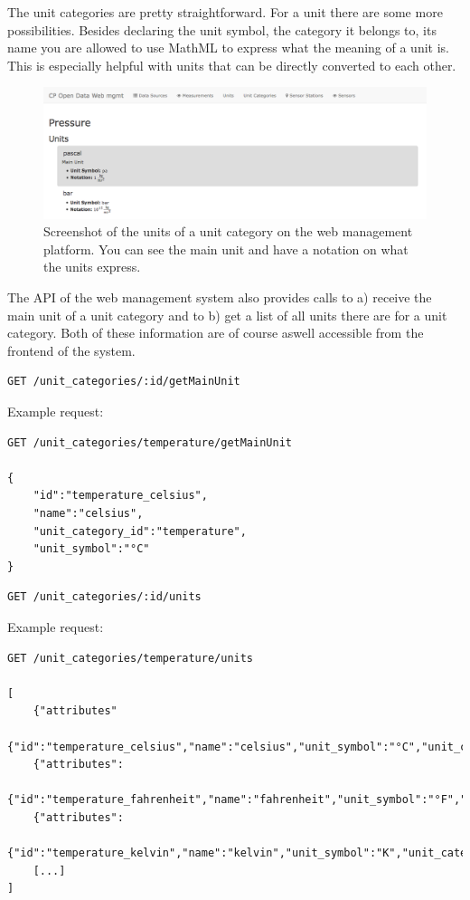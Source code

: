 The unit categories are pretty straightforward. For a unit there are
some more possibilities. Besides declaring the unit symbol, the category
it belongs to, its name you are allowed to use MathML to express what
the meaning of a unit is. This is especially helpful with units that can
be directly converted to each other.

\begin{figure}
	\includegraphics[width=1.00\textwidth]{images/unit_frontend.png}
	\caption{Screenshot of the units of a unit category on the web management platform. You can see the main unit and have a notation on what the units express.}
	\label{fig:screen-units}
\end{figure}

The API of the web management system also provides calls to a) receive
the main unit of a unit category and to b) get a list of all units there
are for a unit category. Both of these information are of course aswell
accessible from the frontend of the system.

\begin{verbatim}
GET /unit_categories/:id/getMainUnit
\end{verbatim}

Example request:

\begin{verbatim}
GET /unit_categories/temperature/getMainUnit

{
    "id":"temperature_celsius",
    "name":"celsius",
    "unit_category_id":"temperature",
    "unit_symbol":"°C"
}
\end{verbatim}

\begin{verbatim}
GET /unit_categories/:id/units
\end{verbatim}

Example request:

\begin{verbatim}
GET /unit_categories/temperature/units

[
    {"attributes"
        {"id":"temperature_celsius","name":"celsius","unit_symbol":"°C","unit_category_id":"temperature","notation":""}},
    {"attributes":
        {"id":"temperature_fahrenheit","name":"fahrenheit","unit_symbol":"°F","unit_category_id":"temperature","notation":""}},
    {"attributes":
        {"id":"temperature_kelvin","name":"kelvin","unit_symbol":"K","unit_category_id":"temperature","notation":""}}
    [...]
]
\end{verbatim}

